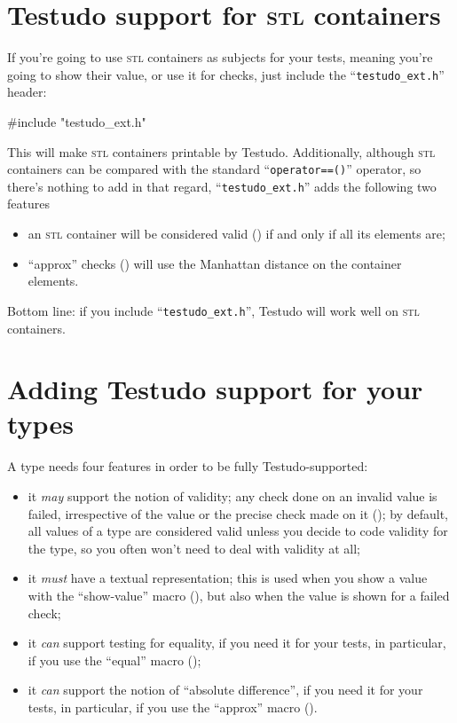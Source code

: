 \documentclass[twoside, a4paper, article]{memoir}
\begin{document}
\chapter{Testudo support for \textsc{stl} containers}
\label{cha:testudo-support-stl-types}

If you're going to use \textsc{stl} containers as subjects for your tests,
meaning you're going to show their value, or use it for checks, just include
the ``\texttt{testudo\_ext.h}'' header:
\begin{cpplisting}
#include "testudo_ext.h"
\end{cpplisting}

This will make \textsc{stl} containers printable by Testudo.  Additionally,
although \textsc{stl} containers can be compared with the standard
``\texttt{operator==()}'' operator, so there's nothing to add in that regard,
``\texttt{testudo\_ext.h}'' adds the following two features
\begin{itemize}
\item an \textsc{stl} container will be considered valid
  () if and only if all its elements are;
\item ``approx'' checks () will use
  the Manhattan distance on the container elements.
\end{itemize}

Bottom line: if you include ``\texttt{testudo\_ext.h}'', Testudo will work well
on \textsc{stl} containers.


\chapter{Adding Testudo support for your types}
\label{cha:adding-testudo-support-your-types}

A type needs four features in order to be fully Testudo-supported:
\begin{itemize}
\item it \emph{may} support the notion of validity; any check done on an
  invalid value is failed, irrespective of the value or the precise check made
  on it (); by default, all values of a type are
  considered valid unless you decide to code validity for the type, so you
  often won't need to deal with validity at all;
\item it \emph{must} have a textual representation; this is used when you show
  a value with the ``show-value'' macro (), but also
  when the value is shown for a failed check;
\item it \emph{can} support testing for equality, if you need it for your
  tests, in particular, if you use the ``equal'' macro
  ();
\item it \emph{can} support the notion of ``absolute difference'', if you need
  it for your tests, in particular, if you use the ``approx'' macro
  ().
\end{itemize}
\end{document}
